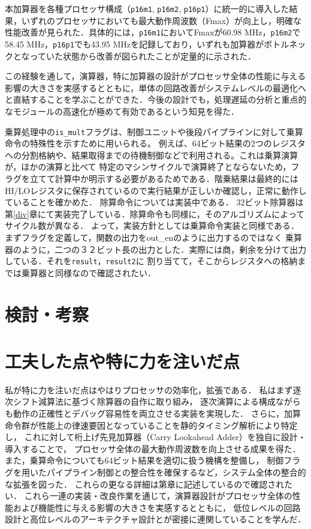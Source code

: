 \documentclass[autodetect-engine,dvi=dvipdfmx,ja=standard,
               a4j,11pt]{bxjsarticle}
\begin{document}
本加算器を各種プロセッサ構成（\texttt{p16m1}, \texttt{p16m2}, \texttt{p16p1}）に統一的に導入した結果，いずれのプロセッサにおいても最大動作周波数（Fmax）が向上し，明確な性能改善が見られた．具体的には，\texttt{p16m1}においてFmaxが60.98 MHz，\texttt{p16m2}で58.45 MHz，\texttt{p16p1}でも43.95 MHzを記録しており，いずれも加算器がボトルネックとなっていた状態から改善が図られたことが定量的に示された．

この経験を通して，演算器，特に加算器の設計がプロセッサ全体の性能に与える影響の大きさを実感するとともに，単体の回路改善がシステムレベルの最適化へと直結することを学ぶことができた．今後の設計でも，処理遅延の分析と重点的なモジュールの高速化が極めて有効であるという知見を得た．


乗算処理中の\texttt{is\_mult}フラグは、制御ユニットや後段パイプラインに対して乗算命令の特殊性を示すために用いられる。
例えば、64ビット結果の2つのレジスタへの分割格納や、結果取得までの待機制御などで利用される。これは乗算演算が，ほかの演算と比べて
特定のマシンサイクルで演算終了とならないため，フラグを立てて計算中か明示する必要があるためである．階乗結果は最終的には
HI/LOレジスタに保存されているので実行結果が正しいか確認し，正常に動作していることを確かめた．
除算命令については実装中である．
32ビット除算器は第\ref{div}章にて実装完了している．除算命令も同様に，そのアルゴリズムによってサイクル数が異なる．
よって，実装方針としては乗算命令実装と同様である．まずフラグを定義して，関数の出力をout\_enのように出力するのではなく
乗算器のように，二つの３２ビット長の出力とした．実際には商，剰余を分けて出力している．それを\verb|result|，\verb|result2|に
割り当てて，そこからレジスタへの格納までは乗算器と同様なので確認されたい．

\section{検討・考察}
\section{工夫した点や特に力を注いだ点}
私が特に力を注いだ点はやはりプロセッサの効率化，拡張である．
私はまず逐次シフト減算法に基づく除算器の自作に取り組み，
逐次演算による構成ながらも動作の正確性とデバッグ容易性を両立させる実装を実現した．
さらに，加算命令群が性能上の律速要因となっていることを静的タイミング解析により特定し，
これに対して桁上げ先見加算器（Carry Lookahead Adder）を独自に設計・導入することで，
プロセッサ全体の最大動作周波数を向上させる成果を得た．また，乗算命令についても64ビット結果を適切に扱う機構を整備し，
制御フラグを用いたパイプライン制御との整合性を確保するなど，システム全体の整合的な拡張を図った．
これらの更なる詳細は第章に記述しているので確認されたい．
これら一連の実装・改良作業を通じて，演算器設計がプロセッサ全体の性能および機能性に与える影響の大きさを実感するとともに，
低位レベルの回路設計と高位レベルのアーキテクチャ設計とが密接に連関していることを学んだ．
\end{document}
